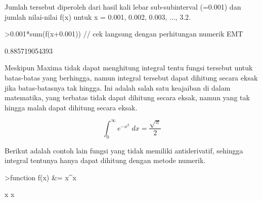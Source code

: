\documentclass{article}
\begin{document}
\begin{eulernotebook}
\begin{eulercomment}
\begin{eulercomment}
\begin{eulercomment}
Jumlah tersebut diperoleh dari hasil kali lebar sub-subinterval
(=0.001) dan jumlah nilai-nilai f(x) untuk x = 0.001, 0.002, 0.003,
..., 3.2.
\end{eulercomment}
\begin{eulerprompt}
>0.001*sum(f(x+0.001)) // cek langsung dengan perhitungan numerik EMT
\end{eulerprompt}
\begin{euleroutput}
  0.885719054393
\end{euleroutput}
\eulersubheading{}
\begin{eulercomment}
Meskipun Maxima tidak dapat menghitung integral tentu fungsi tersebut
untuk batas-batas yang berhingga, namun integral tersebut dapat
dihitung secara eksak jika batas-batasnya tak hingga. Ini adalah salah
satu keajaiban di dalam matematika, yang terbatas tidak dapat dihitung
secara eksak, namun yang tak hingga malah dapat dihitung secara eksak.
\end{eulercomment}
\begin{eulerformula}
\[
\int_{0}^{\infty }{e^ {- x^2 }\;dx}=\frac{\sqrt{\pi}}{2}
\]
\end{eulerformula}
\begin{eulercomment}
Berikut adalah contoh lain fungsi yang tidak memiliki antiderivatif, sehingga
integral tentunya hanya dapat dihitung dengan metode numerik.
\end{eulercomment}
\begin{eulerprompt}
>function f(x) &= x^x
\end{eulerprompt}
\begin{euleroutput}
  
                                     x
                                    x
  

\end{euleroutput}
\end{eulercomment}
\end{eulercomment}
\end{eulernotebook}
\end{document}
